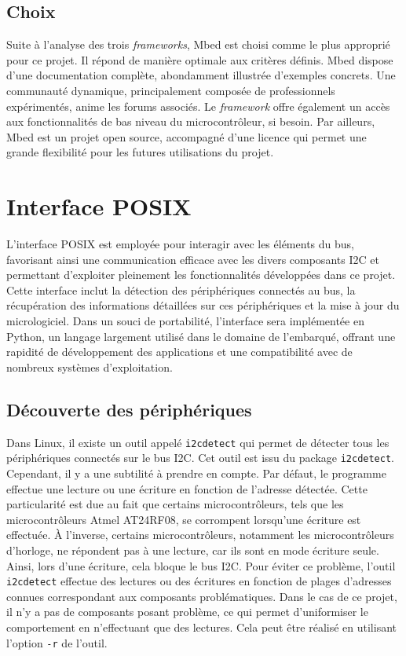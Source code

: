 \subsection{Choix}

Suite à l'analyse des trois \textit{frameworks}, Mbed est choisi comme le plus approprié pour ce projet.
Il répond de manière optimale aux critères définis.
Mbed dispose d'une documentation complète, abondamment illustrée d'exemples concrets.
Une communauté dynamique, principalement composée de professionnels expérimentés, anime les forums associés.
Le \textit{framework} offre également un accès aux fonctionnalités de bas niveau du microcontrôleur, si besoin.
Par ailleurs, Mbed est un projet open source, accompagné d'une licence qui permet une grande flexibilité pour les futures utilisations du projet.

\section{Interface POSIX}

L'interface POSIX est employée pour interagir avec les éléments du bus, favorisant ainsi une communication efficace avec les divers composants I2C et permettant d'exploiter pleinement les fonctionnalités développées dans ce projet.
Cette interface inclut la détection des périphériques connectés au bus, la récupération des informations détaillées sur ces périphériques et la mise à jour du micrologiciel.
Dans un souci de portabilité, l'interface sera implémentée en Python, un langage largement utilisé dans le domaine de l'embarqué, offrant une rapidité de développement des applications et une compatibilité avec de nombreux systèmes d'exploitation.

\subsection{Découverte des périphériques}

Dans Linux, il existe un outil appelé \texttt{i2cdetect} qui permet de détecter tous les périphériques connectés sur le bus I2C.
Cet outil est issu du package \texttt{i2cdetect}.
Cependant, il y a une subtilité à prendre en compte.
Par défaut, le programme effectue une lecture ou une écriture en fonction de l'adresse détectée.
Cette particularité est due au fait que certains microcontrôleurs, tels que les microcontrôleurs Atmel AT24RF08, se corrompent lorsqu'une écriture est effectuée.
À l'inverse, certains microcontrôleurs, notamment les microcontrôleurs d'horloge, ne répondent pas à une lecture, car ils sont en mode écriture seule.
Ainsi, lors d'une écriture, cela bloque le bus I2C.
Pour éviter ce problème, l'outil \texttt{i2cdetect} effectue des lectures ou des écritures en fonction de plages d'adresses connues correspondant aux composants problématiques.
Dans le cas de ce projet, il n'y a pas de composants posant problème, ce qui permet d'uniformiser le comportement en n'effectuant que des lectures.
Cela peut être réalisé en utilisant l'option \texttt{-r} de l'outil.

